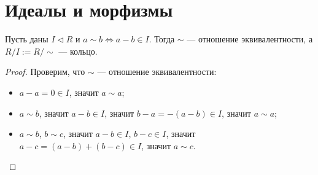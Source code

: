 \documentclass[12pt,a4paper]{article}
\begin{document}
    \section{Идеалы и морфизмы}

    \begin{theorem}
        Пусть даны $I \triangleleft R$ и $a \sim b \Leftrightarrow a-b \in I$. Тогда $\sim$ --- отношение эквивалентности, а $R/I:=R/\sim$ --- кольцо. 
    \end{theorem}

    \begin{proof}
        Проверим, что $\sim$ --- отношение эквивалентности:
        \begin{itemize}
            \item $a - a = 0 \in I$, значит $a \sim a$;
            \item $a\sim b$, значит $a - b \in I$, значит $b-a = -(a - b) \in I$, значит $a \sim a$;
            \item $a\sim b$, $b\sim c$, значит $a-b \in I$, $b - c \in I$, значит $a-c = (a-b) + (b-c) \in I$, значит $a \sim c$.
        \end{itemize}


\end{proof}
\end{document}
